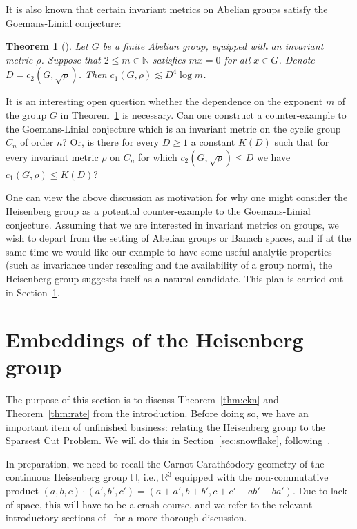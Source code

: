 \documentclass{icm2010}
\newtheorem{theorem}{Theorem}[section]
\theoremstyle{definition}
\newcommand{\R}{\mathbb{R}}
\newcommand{\1}{\mathbf{1}}
\renewcommand{\H}{\mathbb{H}}
\renewcommand{\le}{\leqslant}
\renewcommand{\ge}{\geqslant}
\begin{document}
It is also known that certain invariant metrics on Abelian groups satisfy the Goemans-Linial conjecture:
\begin{theorem}[\cite{ANV07}]\label{thm:lamp}
Let $G$ be a finite Abelian group,
equipped with an invariant metric $\rho$. Suppose that $2\le m\in \mathbb
N$ satisfies $mx=0$ for all $x\in G$. Denote
$D=c_2\left(G,\sqrt{\rho}\right)$. Then $c_1(G,\rho)\lesssim
D^4\log m$.
\end{theorem}
It is an interesting open question whether the dependence on the
exponent $m$ of the group $G$ in Theorem~\ref{thm:lamp} is
necessary. Can one construct a counter-example to the Goemans-Linial
conjecture which is an invariant metric on the cyclic group
$C_n$ of order $n$? Or, is there for every $D\ge 1$ a constant
$K(D)$ such that for every invariant metric $\rho$ on $C_n$ for
which $c_2\left(G,\sqrt{\rho}\right)\le D$ we have $c_1(G,\rho)\le
K(D)$?

One can view the above discussion as motivation for why one might
consider the Heisenberg group as a potential counter-example to the
Goemans-Linial conjecture. Assuming that we are interested in
invariant metrics on groups, we wish to depart from the setting of
Abelian groups or Banach spaces, and if at the same time we would
like our example to have some useful analytic properties (such as
invariance under rescaling and the availability of a group norm),
the Heisenberg group suggests itself as a natural candidate. This
plan is carried out in Section~\ref{sec:heisenberg}.
\section{Embeddings of the Heisenberg group}\label{sec:heisenberg}

The purpose of this section is to discuss Theorem~\ref{thm:ckn} and
Theorem~\ref{thm:rate} from the introduction. Before doing so, we
have an important item of unfinished business: relating the
Heisenberg group to the Sparsest Cut Problem. We will do this in
Section~\ref{sec:snowflake}, following~\cite{LN06}.

In preparation, we need to recall the Carnot-Carath\'eodory geometry of the continuous Heisenberg group $\H$, i.e., $\R^3$ equipped with the non-commutative product $(a,b,c)\cdot (a',b',c')=
(a+a',b+b',c+c'+ab'-ba')$. Due to lack of space, this will have to be a crash course, and we refer  to the relevant introductory sections of~\cite{ckn} for a more thorough discussion.
\end{document}
